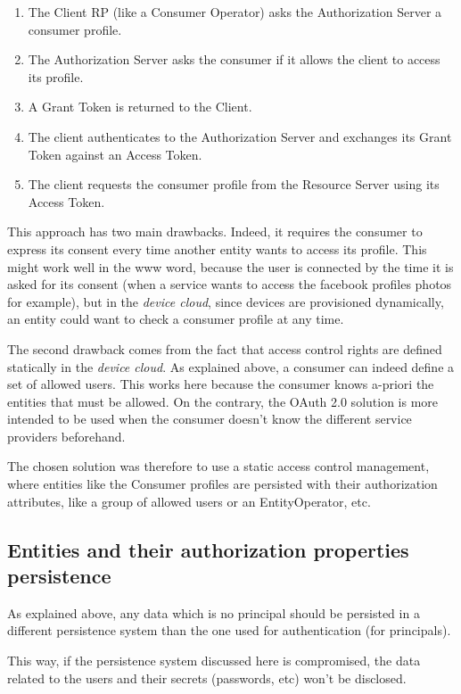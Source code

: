 \begin{enumerate}
	\item The Client RP (like a Consumer Operator) asks the Authorization Server a consumer profile.
	\item The Authorization Server asks the consumer if it allows the client to access its profile.
	\item A Grant Token is returned to the Client.
	\item The client authenticates to the Authorization Server and exchanges its Grant Token against an Access Token.
	\item The client requests the consumer profile from the Resource Server using its Access Token.
\end{enumerate}

This approach has two main drawbacks. Indeed, it requires the consumer to express its consent every time another entity wants to access its profile. This might work well in the www word, because the user is connected by the time it is asked for its consent (when a service wants to access the facebook profiles photos for example), but in the \emph{device cloud}, since devices are provisioned dynamically, an entity could want to check a consumer profile at any time.

The second drawback comes from the fact that access control rights are defined statically in the \emph{device cloud}. As explained above, a consumer can indeed define a set of allowed users. This works here because the consumer knows a-priori the entities that must be allowed. On the contrary, the OAuth 2.0 solution is more intended to be used when the consumer doesn't know the different service providers beforehand.

The chosen solution was therefore to use a static access control management, where entities like the Consumer profiles are persisted with their authorization attributes, like a group of allowed users or an EntityOperator, etc.

\subsection{Entities and their authorization properties persistence}
\label{sec:03_database}
As explained above, any data which is no principal should be persisted in a different persistence system than the one used for authentication (for principals).

This way, if the persistence system discussed here is compromised, the data related to the users and their secrets (passwords, etc) won't be disclosed.

